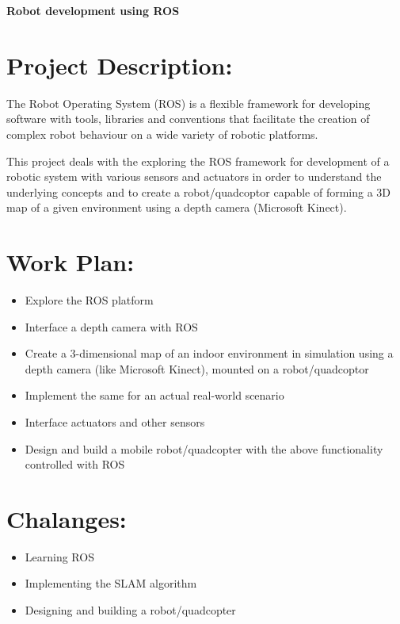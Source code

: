\documentclass{article}
\begin{document}
	\begin{center}
		\huge\textbf{Robot development using ROS}
	\end{center}
	
	\hrulefill
	
	\section*{Project Description:}
		The Robot Operating System (ROS) is a flexible framework for developing software  with tools, libraries and conventions that facilitate the creation of complex robot behaviour on a wide variety of robotic platforms.	
		\newline
		
		\noindent This project deals with the exploring the ROS framework for development of a robotic system with various sensors and actuators in order to understand the underlying concepts and to create a robot/quadcoptor capable of forming a 3D map of a given environment using a depth camera (Microsoft Kinect).
		\newline
			
	\section*{Work Plan:}
	\begin{itemize}
		\item Explore the ROS platform
		\item Interface a depth camera with ROS
		\item Create a 3-dimensional map of an indoor environment in simulation using a depth camera (like Microsoft Kinect), mounted on a robot/quadcoptor
		\item Implement the same for an actual real-world scenario
		
		\item Interface actuators and other sensors 
		\item Design and build a mobile robot/quadcopter with the above functionality controlled with ROS 
	\end{itemize}

	\section*{Chalanges:}
	\begin{itemize}
		\item Learning ROS
		\item Implementing the SLAM algorithm
		\item Designing and building a robot/quadcopter
	\end{itemize}
	
\end{document}
